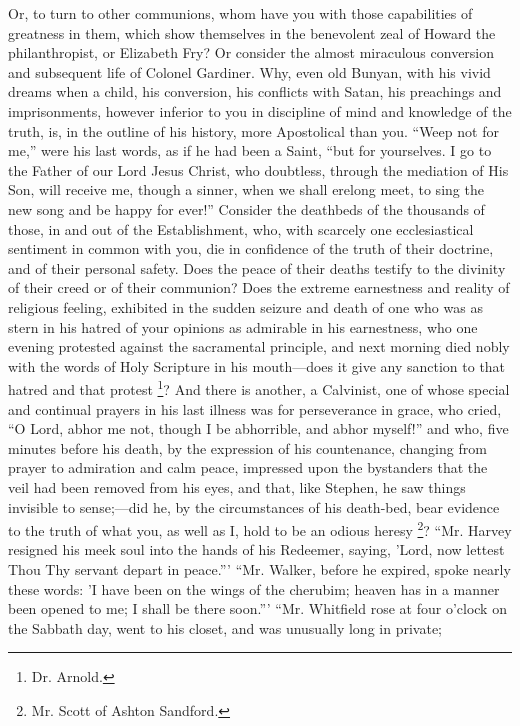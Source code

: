 Or, to turn to other communions, whom have you with those
capabilities of greatness in them, which show themselves in the
benevolent zeal of Howard the philanthropist, or Elizabeth Fry? Or
consider the almost miraculous conversion and subsequent life of
Colonel Gardiner. Why, even old Bunyan, with his vivid dreams when a
child, his conversion, his conflicts with Satan, his preachings and
imprisonments, however inferior to you in discipline of mind and
knowledge of the truth, is, in the outline of his history, more
Apostolical than you. ``Weep not for me,'' were his last
words, as if he had been a Saint, ``but for yourselves. I go to
the Father of our Lord Jesus Christ, who doubtless, through the
mediation of His Son, will receive me, though a sinner, when we shall
erelong meet, to sing the new song and be happy for ever!''
Consider the deathbeds of the thousands of those, in and out of the
Establishment, who, with scarcely one ecclesiastical sentiment in
common with you, die in confidence of the truth of their doctrine, and
of their personal safety. Does the peace of their deaths testify to
the divinity of their creed or of their communion? Does the extreme
earnestness and reality of religious feeling, exhibited in the sudden
seizure and death of one who was as stern in his hatred of your
opinions as admirable in his earnestness, who one evening protested
against the sacramental principle, and next morning died nobly with
the words of Holy Scripture in his mouth—does it give any sanction
to that hatred and that protest \footnote{Dr. Arnold.}? And there is another, a Calvinist, one of whose special and
continual prayers in his last illness was for perseverance in grace,
who cried, ``O Lord, abhor me not, though I be abhorrible, and abhor
myself!'' and who, five minutes before his death, by the
expression of his countenance, changing from prayer to admiration and
calm peace, impressed upon the bystanders that the veil had been
removed from his eyes, and that, like Stephen, he saw things invisible
to sense;—did he, by the circumstances of his death-bed, bear
evidence to the truth of what you, as well as I, hold to be an odious
heresy \footnote{Mr. Scott of Ashton Sandford.}? ``Mr. Harvey
resigned his meek soul into the hands of his Redeemer, saying, 'Lord,
now lettest Thou Thy servant depart in peace.''' ``Mr. Walker,
before he expired, spoke nearly these words: 'I have been on the wings
of the cherubim; heaven has in a manner been opened to me; I shall be
there soon.''' ``Mr. Whitfield rose at four o'clock on the
Sabbath day, went to his closet, and was unusually long in private;
